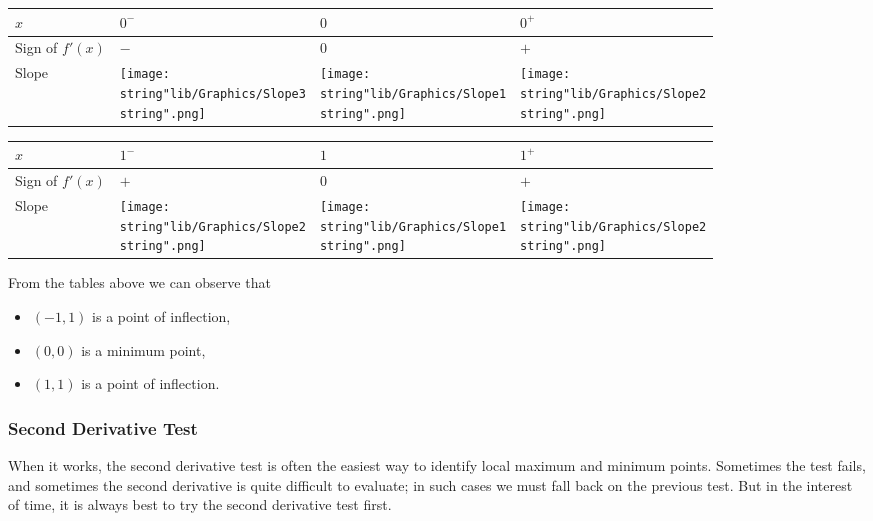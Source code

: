 \documentclass[11pt,a4paper]{book}
\begin{document}
\begin{example}
\begin{center}
\begin{tabular}[t]{|>{\centering}m{1.8cm}|>{\centering}m{1.3cm}|>{\centering}m{1.3cm}|>{\centering}m{1.3cm}|}
\hline
$x$ & $0^{-}$ & $0$ & $0^{+}$\tabularnewline
\hline
Sign of $f'(x)$ & $-$ & $0$ & $+$\tabularnewline
\hline
Slope & \texttt{[image: \\string"lib/Graphics/Slope3\\string".png]} & \texttt{[image: \\string"lib/Graphics/Slope1\\string".png]} & \texttt{[image: \\string"lib/Graphics/Slope2\\string".png]}\tabularnewline
\hline
\end{tabular}
\par\end{center}

\begin{center}
\begin{tabular}[t]{|>{\centering}m{1.8cm}|>{\centering}m{1.3cm}|>{\centering}m{1.3cm}|>{\centering}m{1.3cm}|}
\hline
$x$ & $1^{-}$ & $1$ & $1^{+}$\tabularnewline
\hline
Sign of $f'(x)$ & $+$ & $0$ & $+$\tabularnewline
\hline
Slope & \texttt{[image: \\string"lib/Graphics/Slope2\\string".png]} & \texttt{[image: \\string"lib/Graphics/Slope1\\string".png]} & \texttt{[image: \\string"lib/Graphics/Slope2\\string".png]}\tabularnewline
\hline
\end{tabular}
\par\end{center}

From the tables above we can observe that
\begin{itemize}
\item $\left(-1,1\right)$ is a point of inflection,
\item $\left(0,0\right)$ is a minimum point,
\item $\left(1,1\right)$ is a point of inflection.
\end{itemize}

\end{example}


\subsubsection{Second Derivative Test}

When it works, the second derivative test is often the easiest way
to identify local maximum and minimum points. Sometimes the test fails, and sometimes the second derivative is quite difficult to evaluate;
in such cases we must fall back on the previous test. But in the interest
of time, it is always best to try the second derivative test first.
\end{document}
